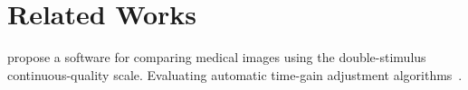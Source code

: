 
\section{Related Works}\label{section:relatedworks}

\cite{hemmsen_ultrasound_2010} propose a software for comparing medical images using the double-stimulus continuous-quality scale.
Evaluating automatic time-gain adjustment algorithms~\cite{axelsen_evaluation_2010, moshavegh_advanced_2015}.

